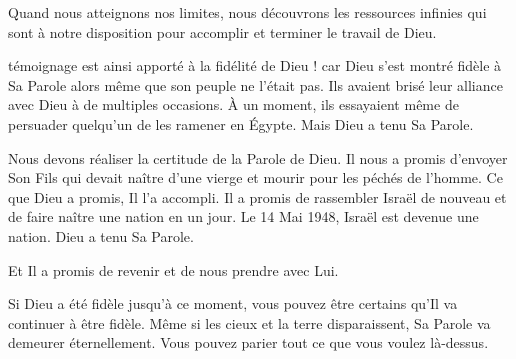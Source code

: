 
Quand nous atteignons nos limites, nous découvrons les ressources infinies
 qui sont à notre disposition pour accomplir et terminer le travail de Dieu.

\dvrule






 témoignage est ainsi apporté
 à la fidélité de Dieu ! \ocadr car Dieu s'est montré fidèle
 à Sa Parole alors même que son peuple ne l'était pas.
 Ils avaient brisé leur alliance avec Dieu à de multiples occasions.
 \`A un moment, ils essayaient même de persuader quelqu'un
 de les ramener en Égypte. Mais Dieu a tenu Sa Parole.


Nous devons réaliser la certitude de la Parole de Dieu.
 Il nous a promis d'envoyer Son Fils qui devait naître
 d'une vierge et mourir pour les péchés de l'homme.
 Ce que Dieu a promis, Il l'a accompli.
 Il a promis de rassembler Israël de nouveau
 et de faire naître une nation en un jour.
 Le 14 Mai 1948, Israël est devenue une nation. Dieu a tenu Sa Parole.

Et Il a promis de revenir et de nous prendre avec Lui.

Si Dieu a été fidèle jusqu'à ce moment, vous pouvez être certains
 qu'Il va continuer à être fidèle. Même si les cieux et la terre disparaissent,
 Sa Parole va demeurer éternellement.
 Vous pouvez parier tout ce que vous voulez là-dessus. 

